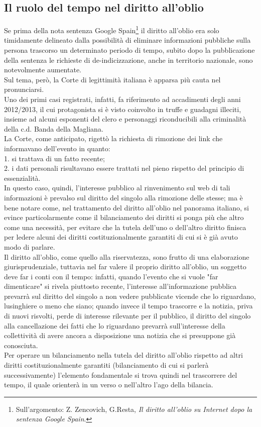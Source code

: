 \subsection{Il ruolo del tempo nel diritto all'oblio}
Se prima della nota sentenza Google Spain\footnote{Sull'argomento: Z. Zencovich, G.Resta, \textit{Il diritto all’oblio su Internet dopo la sentenza Google Spain}.} il diritto all'oblio era solo timidamente delineato dalla possibilità di eliminare informazioni pubbliche sulla persona trascorso un determinato periodo di tempo, subito dopo la pubblicazione della sentenza le richieste di de-indicizzazione, anche in territorio nazionale, sono notevolmente aumentate.
\\Sul tema, però, la Corte di legittimità italiana è apparsa più cauta nel pronunciarsi.
\\Uno dei primi casi registrati, infatti, fa riferimento ad accadimenti degli anni 2012/2013, il cui protagonista si è visto coinvolto in truffe e guadagni illeciti, insieme ad alcuni esponenti del clero e personaggi riconducibili alla criminalità della c.d. Banda della Magliana.
\\La Corte, come anticipato, rigettò la richiesta di rimozione dei link che informavano dell'evento in quanto:
\\1. si trattava di un fatto recente;
\\2. i dati personali risultavano essere trattati nel pieno rispetto del principio di essenzialità.
\\In questo caso, quindi, l'interesse pubblico al rinvenimento sul web di tali informazioni è prevalso sul diritto del singolo alla rimozione delle stesse; ma è bene notare come, nel trattamento del diritto all'oblio nel panorama italiano, si evince particolarmente come il bilanciamento dei diritti si ponga più che altro come una necessità, per evitare che la tutela dell'uno o dell'altro diritto finisca per ledere alcuni dei diritti costituzionalmente garantiti di cui si è già avuto modo di parlare.
\\Il diritto all'oblio, come quello alla riservatezza, sono frutto di una elaborazione giurisprudenziale, tuttavia nel far valere il proprio diritto all'oblio, un soggetto deve far i conti con il tempo: infatti, quando l'evento che si vuole "far dimenticare" si rivela piuttosto recente, l'interesse all'informazione pubblica prevarrà sul diritto del singolo a non vedere pubblicate vicende che lo riguardano, lusinghiere o meno che siano; quando invece il tempo trascorre e la notizia, priva di nuovi risvolti, perde di interesse rilevante per il pubblico, il diritto del singolo alla cancellazione dei fatti che lo riguardano prevarrà sull'interesse della collettività di avere ancora a disposizione una notizia che si presuppone già conosciuta.
\\Per operare un bilanciamento nella tutela del diritto all'oblio rispetto ad altri diritti costituzionalmente garantiti (bilanciamento di cui si parlerà successivamente) l'elemento fondamentale si trova quindi nel trascorrere del tempo, il quale orienterà in un verso o nell'altro l'ago della bilancia.


